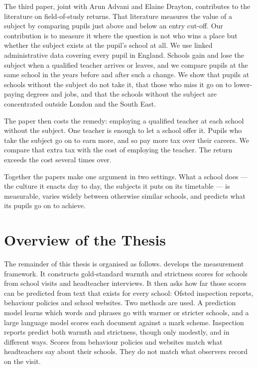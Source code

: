 The third paper, joint with Arun Advani and Elaine Drayton, contributes to
the literature on field-of-study returns. That literature measures the
value of a subject by comparing pupils just above and below an entry
cut-off. Our contribution is to measure it where the question is not who
wins a place but whether the subject exists at the pupil's school at all.
We use linked administrative data covering every pupil in England. Schools
gain and lose the subject when a qualified teacher arrives or leaves, and
we compare pupils at the same school in the years before and after such a
change. We show that pupils at schools without the subject do not take it,
that those who miss it go on to lower-paying degrees and jobs, and that
the schools without the subject are concentrated outside London and the
South East.

The paper then costs the remedy: employing a qualified teacher at each
school without the subject. One teacher is enough to let a school offer
it. Pupils who take the subject go on to earn more,
and so pay more tax over their careers. We compare that extra tax with the
cost of employing the teacher.
The return exceeds the cost several times over.

Together the papers make one argument in two settings. What a school does
--- the culture it enacts day to day, the subjects it puts on its timetable
--- is measurable, varies widely between otherwise similar schools, and
predicts what its pupils go on to achieve.

\section{Overview of the Thesis}
\label{sec:intro_overview}

The remainder of this thesis is organised as follows.
 develops the measurement framework. It constructs
gold-standard warmth and strictness scores for \NTierOne{} schools from
school visits and headteacher interviews. It then asks how far those scores
can be predicted from text that exists for every school: Ofsted inspection
reports, behaviour policies and school websites. Two methods are used. A
prediction model learns which words and phrases go with warmer or stricter
schools, and a large language model scores each document against a mark
scheme. Inspection reports predict both warmth and strictness, though only
modestly, and in different ways. Scores from behaviour policies and websites match what headteachers
say about their schools. They do not match what observers record on the
visit.

